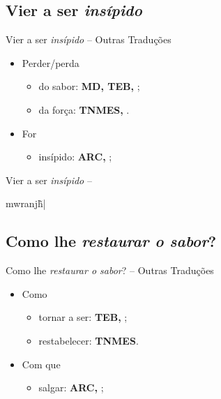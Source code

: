 \documentclass[12pt,aspectratio=169]{beamer}
\newcommand{\YEL}[1]{{\textcolor{TXyel}{#1}}}
\newcommand{\BRI}[1]{{\textcolor{BSpbg}{#1}}}   %
\newcommand{\GRtxt}[1]{\begin{otherlanguage}{greek}{{#1}}\end{otherlanguage}}
\begin{document}
    \subsection{Vier a ser \textit{insípido\/}}

    \begin{frame}{\BRI{Vier a ser \YEL{\textit{insípido\/}} -- Outras Traduções}}
        \begin{itemize}
            \item<1-> \YEL{Perder/perda}
                \begin{itemize}
                    \item<1-> \YEL{do sabor}: \BRI{\textbf{MD, TEB, }};
                    \item<2-> \YEL{da força}: \BRI{\textbf{TNMES, }}.
                \end{itemize}
            \item<3-> \YEL{For}
                \begin{itemize}
                    \item<1-> \YEL{insípido}: \BRI{\textbf{ARC, }};
                \end{itemize}
        \end{itemize}
    \end{frame}

    \begin{frame}{\BRI{Vier a ser \YEL{\textit{insípido\/}} -- \GRtxt{mwranj\~h|}}}
    \end{frame}

    \subsection{Como lhe \textit{restaurar o sabor\/}?}

    \begin{frame}{\BRI{Como lhe \textit{restaurar o sabor\/}? -- Outras Traduções}}
        \begin{itemize}
            \item<1-> \YEL{Como}
                \begin{itemize}
                    \item<1-> \YEL{tornar a ser}: \BRI{\textbf{TEB, }};
                    \item<2-> \YEL{restabelecer}: \BRI{\textbf{TNMES}}.
                \end{itemize}
            \item<3-> \YEL{Com que}
                \begin{itemize}
                    \item<1-> \YEL{salgar}: \BRI{\textbf{ARC, }};
                \end{itemize}
        \end{itemize}
    \end{frame}
\end{document}
